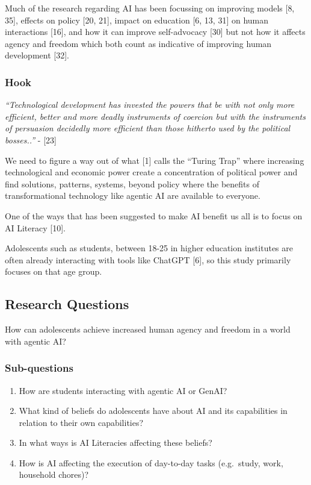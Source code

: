 \documentclass[
  letterpaper,
  DIV=11,
  numbers=noendperiod]{scrartcl}
\providecommand{\tightlist}{%
  \setlength{\itemsep}{0pt}\setlength{\parskip}{0pt}}
\begin{document}
Much of the research regarding AI has been focussing on improving models
{[}8, 35{]}, effects on policy {[}20, 21{]}, impact on education {[}6,
13, 31{]} on human interactions {[}16{]}, and how it can improve
self-advocacy {[}30{]} but not how it affects agency and freedom which
both count as indicative of improving human development {[}32{]}.

\subsubsection{Hook}\label{hook}

\emph{``Technological development has invested the powers that be with
not only more efficient, better and more deadly instruments of coercion
but with the instruments of persuasion decidedly more efficient than
those hitherto used by the political bosses..''} - {[}23{]}

We need to figure a way out of what {[}1{]} calls the ``Turing Trap''
where increasing technological and economic power create a concentration
of political power and find solutions, patterns, systems, beyond policy
where the benefits of transformational technology like agentic AI are
available to everyone.

One of the ways that has been suggested to make AI benefit us all is to
focus on AI Literacy {[}10{]}.

Adolescents such as students, between 18-25 in higher education
institutes are often already interacting with tools like ChatGPT
{[}6{]}, so this study primarily focuses on that age group.

\subsection{Research Questions}\label{research-questions}

How can adolescents achieve increased human agency and freedom in a
world with agentic AI?

\subsubsection{Sub-questions}\label{sub-questions}

\begin{enumerate}
\def\labelenumi{\arabic{enumi}.}
\tightlist
\item
  How are students interacting with agentic AI or GenAI?
\item
  What kind of beliefs do adolescents have about AI and its capabilities
  in relation to their own capabilities?
\item
  In what ways is AI Literacies affecting these beliefs?
\item
  How is AI affecting the execution of day-to-day tasks (e.g.~study,
  work, household chores)?
\end{enumerate}
\end{document}
